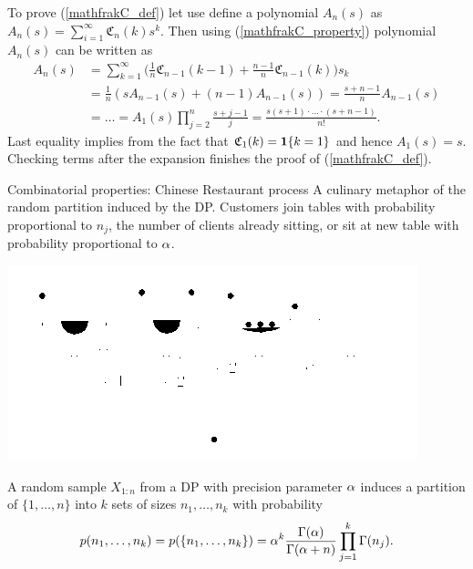 To prove (\ref{mathfrakC_def}) let use define a polynomial $A_n(s)$ as $A_n(s) = \sum_{i=1}^\infty \mathfrak{C}_n(k)s^k$. Then using (\ref{mathfrakC_property}) polynomial $A_n(s)$ can be written as
\begin{equation*}
\begin{split}
    A_n(s)&=\sum_{k=1}^\infty \bigg(  \frac 1n \mathfrak{C}_{n-1}(k-1)+\frac{n-1}{n}\mathfrak{C}_{n-1}(k)   \bigg) s_k\\
    &=\frac{1}{n}( s A_{n-1}(s) +(n-1) A_{n-1}(s) )=\frac{s+n-1}{n}A_{n-1}(s)\\
    &=\ldots=A_1(s)\prod_{j=2}^n\frac{s+j-1}{j}=\frac{s(s+1)\cdot\ldots\cdot(s+n-1)}{n!}.
\end{split}
\end{equation*}
Last equality implies from the fact that $\mathfrak{C}_1(k)=\mathbf 1\{k=1\}$ and hence $A_1(s)=s$. Checking terms after the expansion finishes the proof of (\ref{mathfrakC_def}).







{Combinatorial properties: Chinese Restaurant process}
A culinary metaphor of the \alert{random partition} induced by the DP. Customers join tables with probability proportional to \alert{$n_j$}, the number of clients already sitting, or sit at new table with probability  proportional to \alert{$\alpha$}.
\begin{center}
	\includegraphics[width = .5\textwidth]{figures_julyan/intro_DP/CRP}
\end{center}

\begin{proposition}
A random sample $X_{1:n}$ from a DP with precision parameter $\alpha$ induces a partition of $\{1,\ldots,n\}$ into $k$ sets of sizes $n_1,\ldots,n_k$ with probability 
\begin{equation*}
    p(n_1,\ldots,n_k)=p(\{n_1,\ldots,n_k\})=\alpha^k\frac{\Gamma(\alpha)}{\Gamma(\alpha+n)}\prod_{j=1}^k\Gamma (n_j).
\end{equation*}
\end{proposition}



